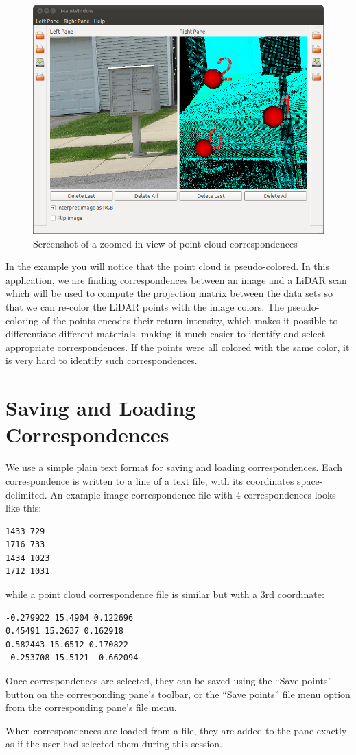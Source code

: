 \documentclass{InsightArticle}
\begin{document}
\begin{center}
  \begin{figure}[H]
  \centering
    \includegraphics[width=0.6\linewidth]{images/PointCloudZoomedIn}
    \caption{Screenshot of a zoomed in view of point cloud correspondences}
    \label{fig:PointCloudZoomedIn}
  \end{figure}
\end{center} 

In the example you will notice that the point cloud is pseudo-colored. In this application, we are finding correspondences between an image and a LiDAR scan which will be used to compute the projection matrix between the data sets so that we can re-color the LiDAR points with the image colors. The pseudo-coloring of the points encodes their return intensity, which makes it possible to differentiate different materials, making it much easier to identify and select appropriate correspondences. If the points were all colored with the same color, it is very hard to identify such correspondences.

\section{Saving and Loading Correspondences}
We use a simple plain text format for saving and loading correspondences. Each correspondence is written to a line of a text file, with its coordinates space-delimited. An example image correspondence file with 4 correspondences looks like this:
\begin{verbatim}
1433 729
1716 733
1434 1023
1712 1031
\end{verbatim}

while a point cloud correspondence file is similar but with a 3rd coordinate:

\begin{verbatim}
-0.279922 15.4904 0.122696
0.45491 15.2637 0.162918
0.582443 15.6512 0.170822
-0.253708 15.5121 -0.662094
\end{verbatim}

Once correspondences are selected, they can be saved using the ``Save points'' button on the corresponding pane's toolbar, or the ``Save points'' file menu option from the corresponding pane's file menu.

When correspondences are loaded from a file, they are added to the pane exactly as if the user had selected them during this session.
\end{document}
